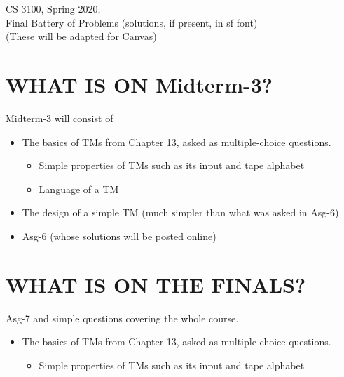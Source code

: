 \documentclass[10pt]{article}
\begin{document}



\begin{center}
\begin{large}
  CS 3100, Spring 2020, \\
  Final Battery of Problems (solutions, if present, in {\sf sf font}) \\
  (These will be adapted for Canvas)
\end{large}
\end{center}

\date{}


\vspace{1ex}

\section{WHAT IS ON Midterm-3?}

\noindent    Midterm-3 will consist of

\begin{itemize}
\item The basics of TMs from Chapter 13, asked as multiple-choice questions.
  \begin{itemize}
  \item Simple properties of TMs such as its input and tape alphabet
  \item Language of a TM
  \end{itemize}

\item The design of a simple TM (much simpler than what was asked in Asg-6)

\item Asg-6 (whose solutions will be posted online)
  
\end{itemize}

\vspace{1ex}

\section{WHAT IS ON THE FINALS?}

\noindent Asg-7 and simple questions covering the whole course.

\begin{itemize}
\item The basics of TMs from Chapter 13, asked as multiple-choice questions.
  \begin{itemize}
  \item Simple properties of TMs such as its input and tape alphabet
  \end{itemize}
\end{itemize}
\end{document}

